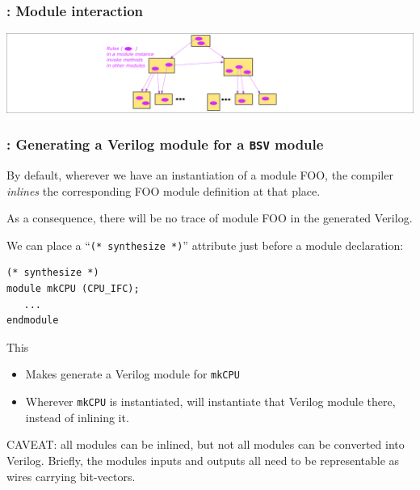 
\begin{frame}
\frametitle{{\BSV}: Module interaction}

\begin{center}
\includegraphics[width=\textwidth]{../Figures/Fig_BSV_module_interaction}
\end{center}

\end{frame}


\begin{frame}[fragile]
\frametitle{{\BSV}: Generating a Verilog module for a {\tt BSV} module}

\footnotesize

By default, wherever we have an instantiation of a module FOO, the
{\bsc} compiler \emph{inlines} the corresponding FOO module definition
at that place.

\vspace{1ex}

As a consequence, there will be no trace of module FOO in the generated Verilog.

\vspace{4ex}

We can place a ``\verb|(* synthesize *)|'' attribute just before a module declaration:

\begin{Verbatim}[frame=single]
(* synthesize *)
module mkCPU (CPU_IFC);
   ...
endmodule
\end{Verbatim}

This
\begin{itemize}
 \item Makes {\bsc} generate a Verilog module for {\tt mkCPU}

 \item Wherever {\tt mkCPU} is instantiated, {\bsc} will instantiate
       that Verilog module there, instead of inlining it.

\end{itemize}

\vspace{2ex}

CAVEAT: all {\BSV} modules can be inlined, but not all {\BSV} modules
can be converted into Verilog.  Briefly, the modules inputs and
outputs all need to be representable as wires carrying bit-vectors.

\end{frame}

